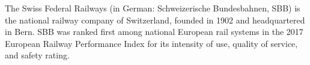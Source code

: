 The Swiss Federal Railways (in German: Schweizerische Bundesbahnen, SBB) is the national railway company of Switzerland, founded in 1902 and headquartered in Bern.
SBB was ranked first among national European rail systems in the 2017 European Railway Performance Index for its intensity of use,
quality of service, and safety rating.